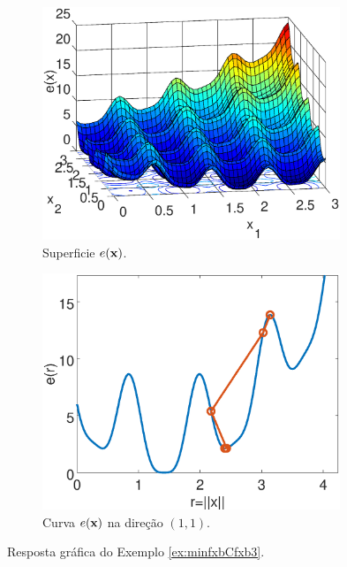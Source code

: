 \begin{figure}[h!]
     \centering
     \begin{subfigure}[b]{0.49\textwidth}
         \centering
         \includegraphics[width=0.98\textwidth]{chapters/minimization-fx/mfiles/fx3/surfcfx3.eps}
         \caption{Superficie $e(\VECTOR{x})$. }
         \label{fig:ex:minfxbCfxb3:a}
     \end{subfigure}
     \hfill
     \begin{subfigure}[b]{0.49\textwidth}
         \centering
         \includegraphics[width=0.98\textwidth]{chapters/minimization-fx/mfiles/fx3/plotfx3.eps}
         \caption{Curva $e(\VECTOR{x})$ na direção $(1,1)$.}
         \label{fig:ex:minfxbCfxb3:b}
     \end{subfigure}
        \caption{Resposta gráfica do Exemplo \ref{ex:minfxbCfxb3}. }
        \label{fig:ex:minfxbCfxb3}
\end{figure}

